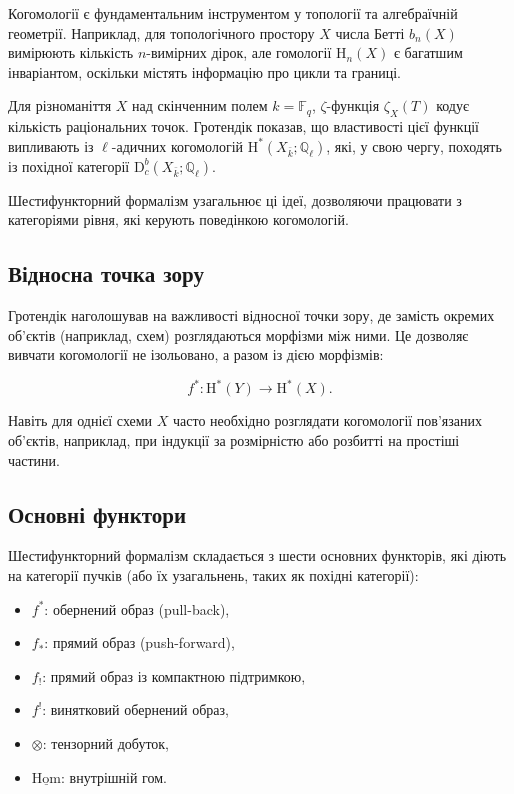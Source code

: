\documentclass{article}
\begin{document}
Когомології є фундаментальним інструментом у топології та алгебраїчній геометрії. Наприклад, для топологічного простору \( X \) числа Бетті \( b_n(X) \) вимірюють кількість \( n \)-вимірних дірок, але гомології \( \mathrm{H}_n(X) \) є багатшим інваріантом, оскільки містять інформацію про цикли та границі.

\begin{example}
Для різноманіття \( X \) над скінченним полем \( k = \mathbb{F}_q \), \(\zeta\)-функція \( \zeta_X(T) \) кодує кількість раціональних точок. Гротендік показав, що властивості цієї функції випливають із \(\ell\)-адичних когомологій \( \mathrm{H}^*(X_{\bar{k}}; \mathbb{Q}_\ell) \), які, у свою чергу, походять із похідної категорії \( \mathrm{D}_c^b(X_{\bar{k}}; \mathbb{Q}_\ell) \).
\end{example}

Шестифункторний формалізм узагальнює ці ідеї, дозволяючи працювати з категоріями рівня, які керують поведінкою когомологій.

\subsection{Відносна точка зору}

Гротендік наголошував на важливості відносної точки зору, де замість окремих об’єктів (наприклад, схем) розглядаються морфізми між ними. Це дозволяє вивчати когомології не ізольовано, а разом із дією морфізмів:

\[
f^*: \mathrm{H}^*(Y) \to \mathrm{H}^*(X).
\]

\begin{remark}
Навіть для однієї схеми \( X \) часто необхідно розглядати когомології пов’язаних об’єктів, наприклад, при індукції за розмірністю або розбитті на простіші частини.
\end{remark}

\subsection{Основні функтори}

Шестифункторний формалізм складається з шести основних функторів, які діють на категорії пучків (або їх узагальнень, таких як похідні категорії):

\begin{itemize}
    \item \( f^* \): обернений образ (pull-back),
    \item \( f_* \): прямий образ (push-forward),
    \item \( f_! \): прямий образ із компактною підтримкою,
    \item \( f^! \): винятковий обернений образ,
    \item \( \otimes \): тензорний добуток,
    \item \( \underline{\mathrm{Hom}} \): внутрішній гом.
\end{itemize}
\end{document}
